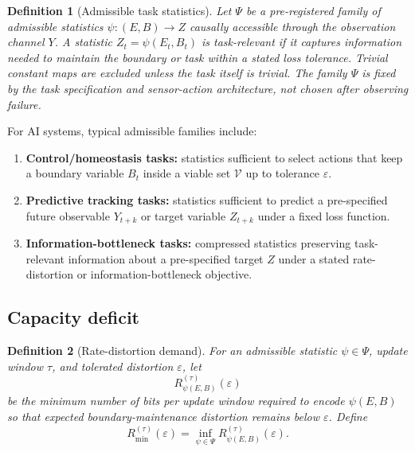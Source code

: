 \documentclass[10pt,a4paper,twocolumn,aps,prl]{revtex4-2}
\newtheorem{definition}{Definition}
\begin{document}
\begin{definition}[Admissible task statistics]
Let $\Psi$ be a pre-registered family of admissible statistics $\psi:(E,B)\to Z$ causally accessible through the observation channel $Y$. A statistic $Z_t=\psi(E_t,B_t)$ is task-relevant if it captures information needed to maintain the boundary or task within a stated loss tolerance. Trivial constant maps are excluded unless the task itself is trivial. The family $\Psi$ is fixed by the task specification and sensor-action architecture, not chosen after observing failure.
\end{definition}

For AI systems, typical admissible families include:
\begin{enumerate}[leftmargin=2em]
    \item \textbf{Control/homeostasis tasks:} statistics sufficient to select actions that keep a boundary variable $B_t$ inside a viable set $\mathcal{V}$ up to tolerance $\varepsilon$.
    \item \textbf{Predictive tracking tasks:} statistics sufficient to predict a pre-specified future observable $Y_{t+k}$ or target variable $Z_{t+k}$ under a fixed loss function.
    \item \textbf{Information-bottleneck tasks:} compressed statistics preserving task-relevant information about a pre-specified target $Z$ under a stated rate-distortion or information-bottleneck objective.
\end{enumerate}

\subsection{Capacity deficit}

\begin{definition}[Rate-distortion demand]
For an admissible statistic $\psi\in\Psi$, update window $\tau$, and tolerated distortion $\varepsilon$, let
\begin{equation}
R_{\psi(E,B)}^{(\tau)}(\varepsilon)
\end{equation}
be the minimum number of bits per update window required to encode $\psi(E,B)$ so that expected boundary-maintenance distortion remains below $\varepsilon$. Define
\begin{equation}
R_{\min}^{(\tau)}(\varepsilon)=\inf_{\psi\in\Psi}R_{\psi(E,B)}^{(\tau)}(\varepsilon).
\label{eq:rmin}
\end{equation}
\end{definition}
\end{document}
